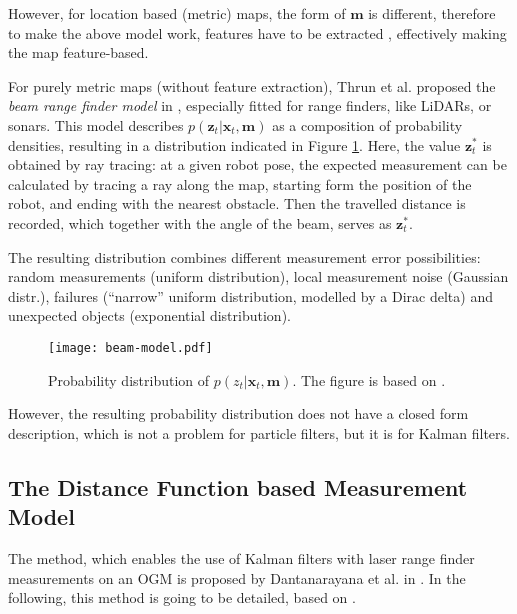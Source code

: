 However, for location based (metric) maps, the form of $\mathbf{m}$ is different, therefore
to make the above model work, features have to be extracted \cite{Durrant-Whyte1991},
effectively making the map feature-based.

For purely metric maps (without feature extraction), Thrun et al. proposed the \emph{beam range finder model}
in \cite{Thrun2005}, especially fitted for range finders, like LiDARs, or sonars.
This model describes  $p(\mathbf{\mathbf{z}}_t | \mathbf{x}_t,\mathbf{m})$ as a composition of
probability densities, resulting in a distribution indicated in Figure \ref{fig:beam-model}.
Here, the value $\mathbf{z}_t^*$ is obtained by ray tracing: at a given robot pose,
the expected measurement can be calculated by tracing a ray along the map, starting form
the position of the robot, and ending with the nearest obstacle. Then the travelled distance is recorded,
which together with the angle of the beam, serves as $\mathbf{z}_t^*$.

The resulting distribution combines different measurement error possibilities:
random measurements (uniform distribution), local measurement noise (Gaussian distr.),
failures (``narrow'' uniform distribution, modelled by a Dirac delta) and unexpected
objects (exponential distribution).
\begin{figure}[htbp]
    \centering
    \texttt{[image: beam-model.pdf]}
    \caption{Probability distribution of $p(z_t | \mathbf{x}_t,\mathbf{m})$.
        The figure is based on \cite{Thrun2005}.}
    \label{fig:beam-model}
\end{figure}

However, the resulting probability distribution does not have a closed form description, which is
not a problem for particle filters, but it is for Kalman filters.

\subsection{The Distance Function based Measurement Model}\label{subsec:dt-meas-model}
The method, which enables the use of Kalman filters with laser range finder measurements on an OGM is proposed
by Dantanarayana et al. in \cite{Dantanarayana2013,Dantanarayana2016}.
In the following, this method is going to be detailed, based on \cite{Dantanarayana2016b}.

